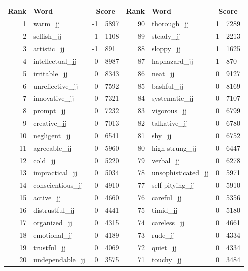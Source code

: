 \begin{table}[tbp]
    \begin{tabular}{| rlr@{.}l | rlr@{.}l |}
    \hline
    \textbf{Rank} & \textbf{Word} & \multicolumn{2}{c|}{\textbf{Score}} & \textbf{Rank} & \textbf{Word} & \multicolumn{2}{c|}{\textbf{Score}} \\
    \hline
    1 & warm\_jj & -1 & 5897    &    90 & thorough\_jj & 1 & 7289 \\
    2 & selfish\_jj & -1 & 1108    &    89 & steady\_jj & 1 & 2213 \\
    3 & artistic\_jj & -1 & 891    &    88 & sloppy\_jj & 1 & 1625 \\
    4 & intellectual\_jj & 0 & 8987    &    87 & haphazard\_jj & 1 & 870 \\
    5 & irritable\_jj & 0 & 8343    &    86 & neat\_jj & 0 & 9127 \\
    6 & unreflective\_jj & 0 & 7592    &    85 & bashful\_jj & 0 & 8169 \\
    7 & innovative\_jj & 0 & 7321    &    84 & systematic\_jj & 0 & 7107 \\
    8 & prompt\_jj & 0 & 7232    &    83 & vigorous\_jj & 0 & 6799 \\
    9 & creative\_jj & 0 & 7013    &    82 & talkative\_jj & 0 & 6780 \\
    10 & negligent\_jj & 0 & 6541    &    81 & shy\_jj & 0 & 6752 \\
    11 & agreeable\_jj & 0 & 5960    &    80 & high-strung\_jj & 0 & 6447 \\
    12 & cold\_jj & 0 & 5220    &    79 & verbal\_jj & 0 & 6278 \\
    13 & impractical\_jj & 0 & 5034    &    78 & unsophisticated\_jj & 0 & 5971 \\
    14 & conscientious\_jj & 0 & 4910    &    77 & self-pitying\_jj & 0 & 5910 \\
    15 & active\_jj & 0 & 4660    &    76 & careful\_jj & 0 & 5356 \\
    16 & distrustful\_jj & 0 & 4441    &    75 & timid\_jj & 0 & 5180 \\
    17 & organized\_jj & 0 & 4315    &    74 & careless\_jj & 0 & 4661 \\
    18 & emotional\_jj & 0 & 4189    &    73 & rude\_jj & 0 & 4334 \\
    19 & trustful\_jj & 0 & 4069    &    72 & quiet\_jj & 0 & 4334 \\
    20 & undependable\_jj & 0 & 3575    &    71 & touchy\_jj & 0 & 3484 \\

\end{tabular}
\end{table}
